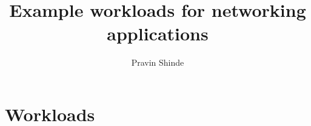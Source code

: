\documentclass{book}
\begin{document}
\title{Example workloads for networking applications}

\author{
Pravin Shinde
}

\date{}

\maketitle

\tableofcontents
\chapter{Workloads}




\end{document}
